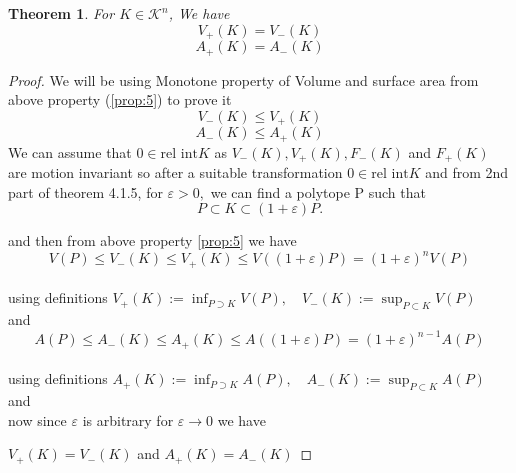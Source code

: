 \documentclass[oneside]{book}
\newtheorem{theorem}{Theorem}[section]
\begin{document}
	\begin{theorem} 	
		\label{t:9}
		For $K \in \mathcal{K}^{n}$, We have 
		\begin{equation}
		\label{eq46}
		V_{+}(K)=V_{-}(K)
		\end{equation}
		\begin{equation}
		\label{eq47}
		A_{+}(K)=A_{-}(K)
		\end{equation}
	\end{theorem}         
	\begin{proof}
		We will be using Monotone property of Volume and surface area from above property (\ref{prop:5}) to prove it \\
		$$V_{-}(K) \leq V_{+}(K)  $$  $$ A_{-}(K) \leq A_{+}(K)$$
		We can assume that $0 \in \text{rel int} K$ as  $V_{-}(K), V_{+}(K), F_{-}(K)$ and $F_{+}(K)$ are \newline motion invariant so after a suitable transformation
		$0 \in \text{rel int} K$ 
		and from 2nd part of theorem 4.1.5,
		for $\varepsilon>0,$ we can find a polytope P such that 
		$$P \subset K \subset(1+\varepsilon) P .$$
		
		and then from above property \ref{prop:5} we have \\ 
		\[
		V(P) \leq V_{-}(K) \leq V_{+}(K) \leq V((1+\varepsilon) P)=(1+\varepsilon)^{n} V(P)
		\] \\
		using definitions $ V_{+}(K):=\inf _{P \supset K} V(P), \quad V_{-}(K):=\sup _{P \subset K} V(P)$ \\
		and   \\
		\[
		A(P) \leq A_{-}(K) \leq A_{+}(K) \leq A((1+\varepsilon) P)=(1+\varepsilon)^{n-1} A(P)
		\]  \\using definitions 
		$ A_{+}(K):=\inf _{P \supset K} A(P), \quad A_{-}(K):=\sup _{P \subset K} A(P) $
		and \\ 
		
		now since $\varepsilon $ is arbitrary for $\varepsilon \rightarrow 0$ we have 
		
		$V_{+}(K)=V_{-}(K)$ and  $A_{+}(K)=A_{-}(K)$
	\end{proof}
	
\end{document}
